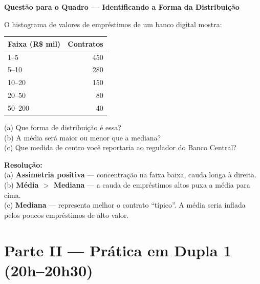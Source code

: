 \begin{SolvedBox}
\textbf{Questão para o Quadro — Identificando a Forma da Distribuição}

O histograma de valores de empréstimos de um banco digital mostra:

\begin{center}
\begin{tabular}{|l|r|}
\hline
\textbf{Faixa (R\$ mil)} & \textbf{Contratos} \\
\hline
1–5     & 450 \\
5–10    & 280 \\
10–20   & 150 \\
20–50   & 80  \\
50–200  & 40  \\
\hline
\end{tabular}
\end{center}

(a) Que forma de distribuição é essa?\\
(b) A média será maior ou menor que a mediana?\\
(c) Que medida de centro você reportaria ao regulador do Banco Central?

\textbf{Resolução:}\\
(a) \textbf{Assimetria positiva} — concentração na faixa baixa, cauda longa à direita.\\
(b) \textbf{Média $>$ Mediana} — a cauda de empréstimos altos puxa a média para cima.\\
(c) \textbf{Mediana} — representa melhor o contrato ``típico''. A média seria
inflada pelos poucos empréstimos de alto valor.
\end{SolvedBox}

\section{Parte II — Prática em Dupla 1 (20h–20h30)}

